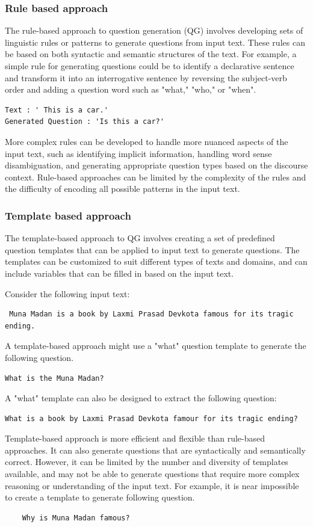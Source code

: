 \documentclass[12pt]{report}
\begin{document}
 \subsubsection{Rule based approach}
 The rule-based approach to question generation (QG) involves developing sets of linguistic rules or patterns to generate questions from input text. These rules can be based on both syntactic and semantic structures of the text. For example, a simple rule for generating questions could be to identify a declarative sentence and transform it into an interrogative sentence by reversing the subject-verb order and adding a question word such as "what," "who," or "when". 
 \begin{verbatim}
Text : ' This is a car.'
Generated Question : 'Is this a car?'
 \end{verbatim}
 More complex rules can be developed to handle more nuanced aspects of the input text, such as identifying implicit information, handling word sense disambiguation, and generating appropriate question types based on the discourse context. Rule-based approaches  can be limited by the complexity of the rules and the difficulty of encoding all possible patterns in the input text.
 \subsubsection{Template based approach}
 The template-based approach to QG involves creating a set of predefined question templates that can be applied to input text to generate questions.  The templates can be customized to suit different types of texts and domains, and can include variables that can be filled in based on the input text. 
 
 Consider the following input text: \\
 \begin{verbatim}
 Muna Madan is a book by Laxmi Prasad Devkota famous for its tragic ending. 
 \end{verbatim}

A template-based approach might use a "what" question template to generate the following question.
\begin{verbatim}
What is the Muna Madan?
\end{verbatim}
A "what" template can also be designed to extract the following question: 
\begin{verbatim}
What is a book by Laxmi Prasad Devkota famour for its tragic ending?
\end{verbatim}
Template-based approach is more efficient and flexible than rule-based approaches. It can also generate questions that are syntactically and semantically correct. However, it can be limited by the number and diversity of templates available, and may not be able to generate questions that require more complex reasoning or understanding of the input text. For example, it is near impossible to create a template to generate following question. 
\begin{verbatim}
    Why is Muna Madan famous?
\end{verbatim}
\end{document}
